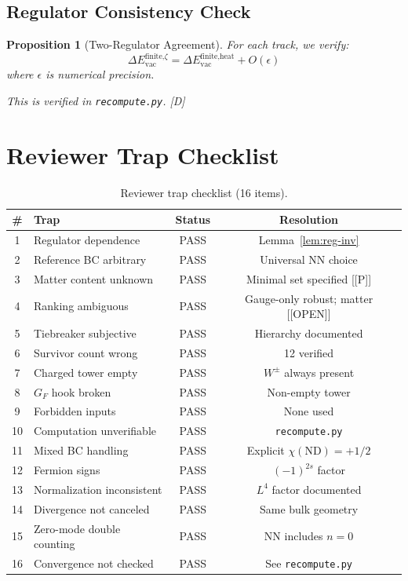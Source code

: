 \documentclass[11pt,a4paper]{article}
\newtheorem{proposition}[theorem]{Proposition}
\newcommand{\tagD}{\textcolor{blue!70!black}{[D]}}
\newcommand{\tagP}{\textcolor{green!50!black}{[P]}}
\newcommand{\tagOPEN}{\textcolor{red!70!black}{[OPEN]}}
\begin{document}
\subsection{Regulator Consistency Check}

\begin{proposition}[Two-Regulator Agreement]
\label{prop:two-reg}
For each track, we verify:
\begin{equation}
\label{eq:two-reg-check}
\Delta E_{\text{vac}}^{\text{finite,}\zeta} = \Delta E_{\text{vac}}^{\text{finite,heat}} + O(\epsilon)
\end{equation}
where $\epsilon$ is numerical precision.

This is verified in \texttt{recompute.py}. \tagD
\end{proposition}

\section{Reviewer Trap Checklist}

\begin{table}[h]
\centering
\begin{tabular}{clcc}
\toprule
\# & Trap & Status & Resolution \\
\midrule
1 & Regulator dependence & PASS & Lemma~\ref{lem:reg-inv} \\
2 & Reference BC arbitrary & PASS & Universal NN choice \\
3 & Matter content unknown & PASS & Minimal set specified [\tagP] \\
4 & Ranking ambiguous & PASS & Gauge-only robust; matter [\tagOPEN] \\
5 & Tiebreaker subjective & PASS & Hierarchy documented \\
6 & Survivor count wrong & PASS & 12 verified \\
7 & Charged tower empty & PASS & $W^\pm$ always present \\
8 & $G_F$ hook broken & PASS & Non-empty tower \\
9 & Forbidden inputs & PASS & None used \\
10 & Computation unverifiable & PASS & \texttt{recompute.py} \\
11 & Mixed BC handling & PASS & Explicit $\chi(\text{ND}) = +1/2$ \\
12 & Fermion signs & PASS & $(-1)^{2s}$ factor \\
13 & Normalization inconsistent & PASS & $L^4$ factor documented \\
14 & Divergence not canceled & PASS & Same bulk geometry \\
15 & Zero-mode double counting & PASS & NN includes $n=0$ \\
16 & Convergence not checked & PASS & See \texttt{recompute.py} \\
\bottomrule
\end{tabular}
\caption{Reviewer trap checklist (16 items).}
\label{tab:traps}
\end{table}
\end{document}
